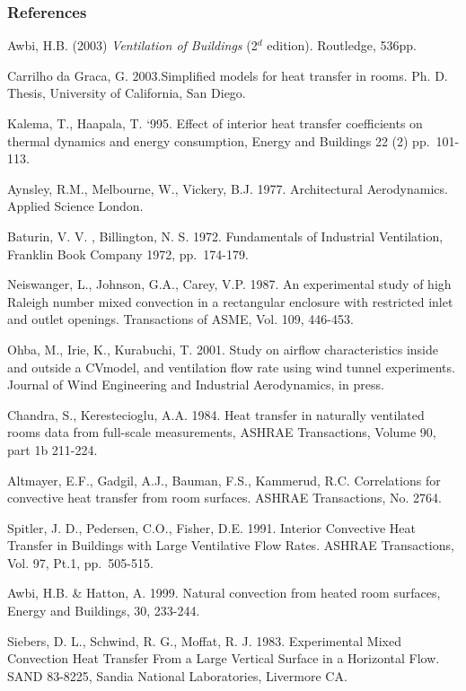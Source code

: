 \subsubsection{References}\label{references-5-000}

Awbi, H.B. (2003) \emph{Ventilation of Buildings} (2\(^{d}\) edition). Routledge, 536pp.

Carrilho da Graca, G. 2003.Simplified models for heat transfer in rooms. Ph. D. Thesis, University of California, San Diego.

Kalema, T., Haapala, T. `995. Effect of interior heat transfer coefficients on thermal dynamics and energy consumption, Energy and Buildings 22 (2) pp.~101-113.

Aynsley, R.M., Melbourne, W., Vickery, B.J. 1977. Architectural Aerodynamics. Applied Science London.

Baturin, V. V. , Billington, N. S. 1972. Fundamentals of Industrial Ventilation, Franklin Book Company 1972, pp.~174-179.

Neiswanger, L., Johnson, G.A., Carey, V.P. 1987. An experimental study of high Raleigh number mixed convection in a rectangular enclosure with restricted inlet and outlet openings. Transactions of ASME, Vol. 109, 446-453.

Ohba, M., Irie, K., Kurabuchi, T. 2001. Study on airflow characteristics inside and outside a CVmodel, and ventilation flow rate using wind tunnel experiments. Journal of Wind Engineering and Industrial Aerodynamics, in press.

Chandra, S., Kerestecioglu, A.A. 1984. Heat transfer in naturally ventilated rooms data from full-scale measurements, ASHRAE Transactions, Volume 90, part 1b 211-224.

Altmayer, E.F., Gadgil, A.J., Bauman, F.S., Kammerud, R.C. Correlations for convective heat transfer from room surfaces. ASHRAE Transactions, No. 2764.

Spitler, J. D., Pedersen, C.O., Fisher, D.E. 1991. Interior Convective Heat Transfer in Buildings with Large Ventilative Flow Rates. ASHRAE Transactions, Vol. 97, Pt.1, pp.~505-515.

Awbi, H.B. \& Hatton, A. 1999. Natural convection from heated room surfaces, Energy and Buildings, 30, 233-244.

Siebers, D. L., Schwind, R. G., Moffat, R. J. 1983. Experimental Mixed Convection Heat Transfer From a Large Vertical Surface in a Horizontal Flow. SAND 83-8225, Sandia National Laboratories, Livermore CA.

